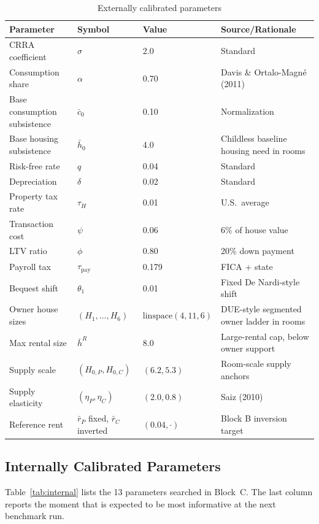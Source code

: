\documentclass[11pt]{article}
\begin{document}
\begin{table}[!htbp]
\centering
\caption{Externally calibrated parameters}
\label{tab:external}
\begin{tabular}{llll}
\toprule
Parameter & Symbol & Value & Source/Rationale \\
\midrule
CRRA coefficient & $\sigma$ & 2.0 & Standard \\
Consumption share & $\alpha$ & 0.70 & Davis \& Ortalo-Magn\'e (2011) \\
Base consumption subsistence & $\bar c_0$ & 0.10 & Normalization \\
Base housing subsistence & $\bar h_0$ & 4.0 & Childless baseline housing need in rooms \\
Risk-free rate & $q$ & 0.04 & Standard \\
Depreciation & $\delta$ & 0.02 & Standard \\
Property tax rate & $\tau_H$ & 0.01 & U.S.\ average \\
Transaction cost & $\psi$ & 0.06 & 6\% of house value \\
LTV ratio & $\phi$ & 0.80 & 20\% down payment \\
Payroll tax & $\tau_{\text{pay}}$ & 0.179 & FICA + state \\
Bequest shift & $\theta_1$ & 0.01 & Fixed De Nardi-style shift \\
Owner house sizes & $(H_1,\ldots,H_6)$ & $\text{linspace}(4,11,6)$ & DUE-style segmented owner ladder in rooms \\
Max rental size & $\bar h^R$ & 8.0 & Large-rental cap, below owner support \\
Supply scale & $(H_{0,P}, H_{0,C})$ & $(6.2, 5.3)$ & Room-scale supply anchors \\
Supply elasticity & $(\eta_P, \eta_C)$ & $(2.0, 0.8)$ & Saiz (2010) \\
Reference rent & $\bar r_P$ fixed, $\bar r_C$ inverted & $(0.04, \cdot)$ & Block B inversion target \\
\bottomrule
\end{tabular}
\end{table}

\subsection{Internally Calibrated Parameters}

Table~\ref{tab:internal} lists the 13 parameters searched in Block~C. The last column reports the moment that is expected to be most informative at the next benchmark run.
\end{document}
